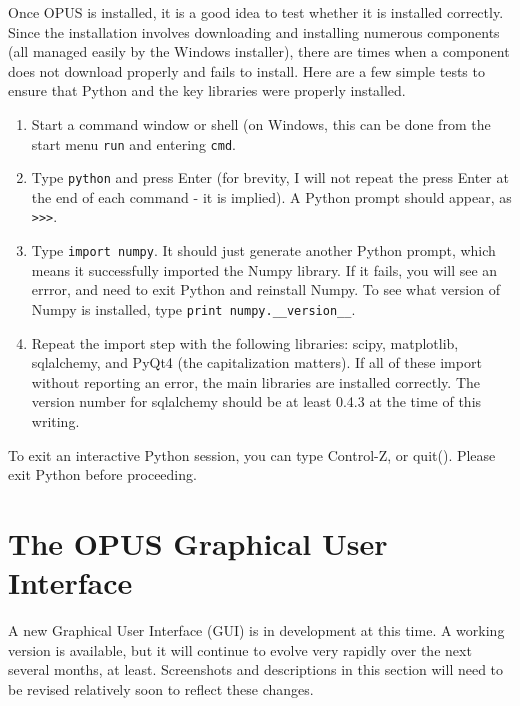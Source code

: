 Once OPUS is installed, it is a good idea to test whether it is installed correctly.  Since the installation involves downloading and installing numerous components (all managed easily by the Windows installer), there are times when a component does not download properly and fails to install.  Here are a few simple tests to ensure that Python and the key libraries were properly installed.

\begin{enumerate}
\item Start a command window or shell (on Windows, this can be done from the start menu \verb#run# and entering \verb#cmd#.
\item Type \verb#python# and press Enter (for brevity, I will not repeat the press Enter at the end of each command - it is implied).  A Python prompt should appear, as \verb#>>>#.
\item Type \verb#import numpy#.  It should just generate another Python prompt, which means it successfully imported the Numpy library.  If it fails, you will see an errror, and need to exit Python and reinstall Numpy.  To see what version of Numpy is installed, type \verb#print numpy.__version__#.
\item Repeat the import step with the following libraries: scipy, matplotlib, sqlalchemy, and PyQt4 (the capitalization matters).  If all of these import without reporting an error, the main libraries are installed correctly.  The version number for sqlalchemy should be at least 0.4.3 at the time of this writing.
\end{enumerate}

To exit an interactive Python session, you can type Control-Z, or quit().  Please exit Python before proceeding.

\section{The OPUS Graphical User Interface}
A new Graphical User Interface (GUI) is in development at this time.  A working version is available, but it will continue to evolve very rapidly over the next several months, at least.  Screenshots and descriptions in this section will need to be revised relatively soon to reflect these changes.

